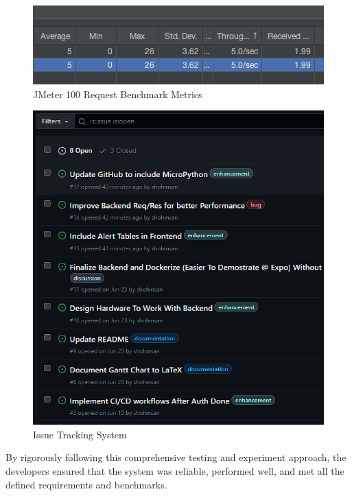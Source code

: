 \begin{figure}[htbp]
    \centering
    \includegraphics[width=1\linewidth]{datasets/images/JMeter_100reqBenchmark.png}
    \caption{JMeter 100 Request Benchmark Metrics}
    \label{fig:figure3}
\end{figure}

\begin{figure}[htbp]
    \centering
    \includegraphics[width=1\linewidth]{datasets/images/GitHubIssues.png}
    \caption{Issue Tracking System}
    \label{fig:gitIssues}
\end{figure}

By rigorously following this comprehensive testing and experiment
approach, the developers ensured that the system was reliable,
performed well, and met all the defined requirements and benchmarks. %